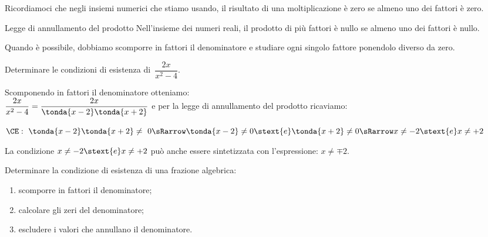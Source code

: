 
Ricordiamoci che negli insiemi numerici che stiamo usando, il risultato 
di una moltiplicazione è zero se almeno uno dei fattori è zero.

\begin{teorema}{Legge di annullamento del prodotto}{}
Nell'insieme dei numeri reali, il prodotto di più fattori è nullo se almeno 
uno dei fattori è nullo.
\end{teorema}

Quando è possibile, dobbiamo scomporre in fattori il denominatore e studiare 
ogni singolo fattore ponendolo diverso da zero.

\begin{esempio}{}{}
Determinare le condizioni di esistenza di~\(\dfrac{2x}{x^{2}-4}\).

Scomponendo in fattori il denominatore otteniamo:\\
\(\dfrac{2x}{x^{2}-4} = \dfrac{2x}{\tonda{x-2}\tonda{x+2}}\)\quad
e per la legge di annullamento del prodotto ricaviamo:

\(\CE:~ \tonda{x-2}\tonda{x+2} \neq~0 \sRarrow 
\tonda{x-2} \neq 0 \stext{e} \tonda{x+2} \neq 0\\
\sRarrow x \neq -2 \stext{e} x \neq +2\)

La condizione \(x \neq -2 \stext{e} x \neq +2\) può anche essere sintetizzata 
con l'espressione: \(x \neq \mp 2\).
\end{esempio}

\begin{procedura}{}{}
Determinare la condizione di esistenza di una frazione algebrica:
\begin{enumerate}[nosep, label=\alph*)]
\item scomporre in fattori il denominatore;
\item calcolare gli zeri del denominatore;
\item escludere i valori che annullano il denominatore.
\end{enumerate}
\end{procedura}


